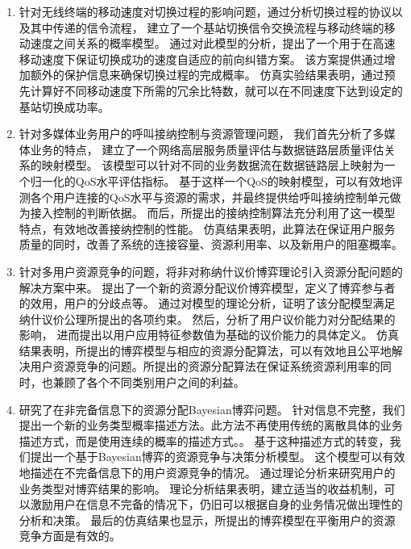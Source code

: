 \begin{enumerate}[(1.)]
\item 针对无线终端的移动速度对切换过程的影响问题，通过分析切换过程的协议以及其中传递的信令流程，
建立了一个基站切换信令交换流程与移动终端的移动速度之间关系的概率模型。
通过对此模型的分析，提出了一个用于在高速移动速度下保证切换成功的速度自适应的前向纠错方案。
该方案提供通过增加额外的保护信息来确保切换过程的完成概率。
仿真实验结果表明，通过预先计算好不同移动速度下所需的冗余比特数，就可以在不同速度下达到设定的基站切换成功率。
\item
针对多媒体业务用户的呼叫接纳控制与资源管理问题，
我们首先分析了多媒体业务的特点，
建立了一个网络高层服务质量评估与数据链路层质量评估关系的映射模型。
该模型可以针对不同的业务数据流在数据链路层上映射为一个归一化的QoS水平评估指标。
基于这样一个QoS的映射模型，可以有效地评测各个用户连接的QoS水平与资源的需求，并最终提供给呼叫接纳控制单元做为接入控制的判断依据。
而后，所提出的接纳控制算法充分利用了这一模型特点，有效地改善接纳控制的性能。
仿真结果表明，此算法在保证用户服务质量的同时，改善了系统的连接容量、资源利用率、以及新用户的阻塞概率。
\item 针对多用户资源竞争的问题，将非对称纳什议价博弈理论引入资源分配问题的解决方案中来。
提出了一个新的资源分配议价博弈模型，定义了博弈参与者的效用，用户的分歧点等。
通过对模型的理论分析，证明了该分配模型满足纳什议价公理所提出的各项约束。
然后，分析了用户议价能力对分配结果的影响，
进而提出以用户应用特征参数值为基础的议价能力的具体定义。
仿真结果表明，所提出的博弈模型与相应的资源分配算法，可以有效地且公平地解决用户资源竞争的问题。所提出的资源分配算法在保证系统资源利用率的同时，也兼顾了各个不同类别用户之间的利益。

\item 研究了在非完备信息下的资源分配Bayesian博弈问题。
针对信息不完整，我们提出一个新的业务类型概率描述方法。此方法不再使用传统的离散具体的业务描述方式，而是使用连续的概率的描述方式。。
基于这种描述方式的转变，我们提出一个基于Bayesian博弈的资源竞争与决策分析模型。
这个模型可以有效地描述在不完备信息下的用户资源竞争的情况。
通过理论分析来研究用户的业务类型对博弈结果的影响。
理论分析结果表明，建立适当的收益机制，可以激励用户在信息不完备的情况下，仍旧可以根据自身的业务情况做出理性的分析和决策。
最后的仿真结果也显示，所提出的博弈模型在平衡用户的资源竞争方面是有效的。
\end{enumerate}

